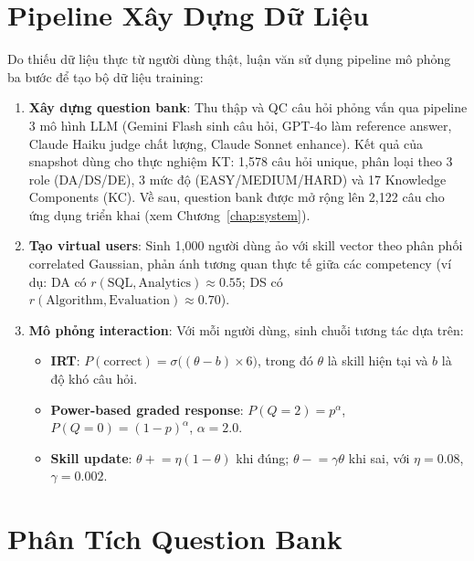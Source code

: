 \documentclass[12pt, a4paper]{report}
\begin{document}
\section{Pipeline Xây Dựng Dữ Liệu}
\label{sec:data_pipeline}

Do thiếu dữ liệu thực từ người dùng thật, luận văn sử dụng pipeline mô phỏng ba bước để tạo bộ dữ liệu training:

\begin{enumerate}
  \item \textbf{Xây dựng question bank}: Thu thập và QC câu hỏi phỏng vấn qua pipeline 3 mô hình LLM (Gemini Flash sinh câu hỏi, GPT-4o làm reference answer, Claude Haiku judge chất lượng, Claude Sonnet enhance). Kết quả của snapshot dùng cho thực nghiệm KT: 1{,}578 câu hỏi unique, phân loại theo 3 role (DA/DS/DE), 3 mức độ (EASY/MEDIUM/HARD) và 17 Knowledge Components (KC). Về sau, question bank được mở rộng lên 2{,}122 câu cho ứng dụng triển khai (xem Chương~\ref{chap:system}).

  \item \textbf{Tạo virtual users}: Sinh 1{,}000 người dùng ảo với skill vector theo phân phối correlated Gaussian, phản ánh tương quan thực tế giữa các competency (ví dụ: DA có $r(\text{SQL}, \text{Analytics}) \approx 0.55$; DS có $r(\text{Algorithm}, \text{Evaluation}) \approx 0.70$).

  \item \textbf{Mô phỏng interaction}: Với mỗi người dùng, sinh chuỗi tương tác dựa trên:
  \begin{itemize}
    \item \textbf{IRT}: $P(\text{correct}) = \sigma\bigl((\theta - b) \times 6\bigr)$, trong đó $\theta$ là skill hiện tại và $b$ là độ khó câu hỏi.
    \item \textbf{Power-based graded response}: $P(Q=2) = p^{\alpha}$, $P(Q=0) = (1-p)^{\alpha}$, $\alpha = 2.0$.
    \item \textbf{Skill update}: $\theta \mathrel{+}= \eta(1 - \theta)$ khi đúng; $\theta \mathrel{-}= \gamma\theta$ khi sai, với $\eta = 0.08$, $\gamma = 0.002$.
  \end{itemize}
\end{enumerate}

\section{Phân Tích Question Bank}
\label{sec:eda_qbank}
\end{document}
